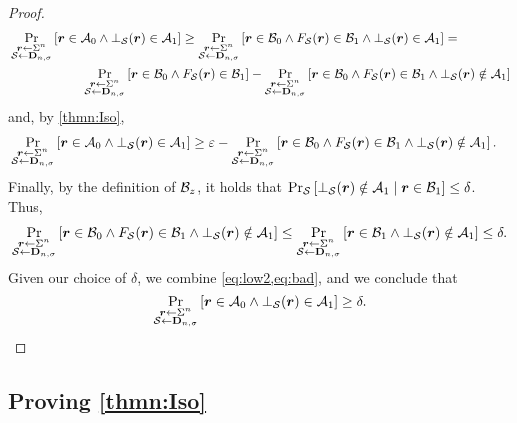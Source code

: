 {\begin{proof}
	\begin{align}
	&\ppr{\substack{\vr\la \Sigma^n\\ \cS\la \bns}}{\vr\in \cA_0\land \bot_{\cS}(\vr)\in \cA_1 } \ge  \ppr{\substack{\vr\la \Sigma^n\\ \cS\la \bns}}{\vr\in \cB_0\land F_\cS(\vr)\in \cB_1 \land \bot_{\cS}(\vr)\in \cA_1 } =  \nonumber\\
	&\hspace*{2cm}\ppr{\substack{\vr\la \Sigma^n\\ \cS\la \bns}}{\vr\in \cB_0\land F_\cS(\vr)\in \cB_1 } - \ppr{\substack{\vr\la \Sigma^n\\ \cS\la \bns}}{\vr\in \cB_0\land F_\cS(\vr)\in \cB_1 \land \bot_{\cS}(\vr)\notin \cA_1 }\nonumber
	\end{align}
	and, by \cref{thmn:Iso},
	\begin{align}
	&\ppr{\substack{\vr\la \Sigma^n\\ \cS\la \bns}}{\vr\in \cA_0\land \bot_{\cS}(\vr)\in \cA_1 } \ge     \label{eq:low2} \eps - \ppr{\substack{\vr\la \Sigma^n\\ \cS\la \bns}}{\vr\in \cB_0\land F_\cS(\vr)\in \cB_1 \land \bot_{\cS}(\vr)\notin \cA_1 }.
	\end{align}
	Finally, by the definition of $\cB_z$, it holds that $\ppr{\cS}{\bot_{\cS}(\vr)\notin \cA_1 \mid \vr\in \cB_1 }\le \delta $. Thus,
	\begin{align}\label{eq:bad} \ppr{\substack{\vr\la \Sigma^n\\ \cS\la \bns}}{\vr\in \cB_0\land F_\cS(\vr)\in \cB_1 \land \bot_{\cS}(\vr)\notin \cA_1 } \le \ppr{\substack{\vr\la \Sigma^n\\ \cS\la \bns}}{\vr\in \cB_1 \land \bot_{\cS}(\vr)\notin \cA_1 }\le \delta.
	\end{align}
	Given our choice of $\delta$, we combine \cref{eq:low2,eq:bad}, and we conclude that $$\ppr{\substack{\vr\la \Sigma^n\\ \cS\la \bns}}{\vr\in \cA_0\land \bot_{\cS}(\vr)\in \cA_1 } \ge \delta.$$
\end{proof}
\subsection{Proving \cref{thmn:Iso}}
}






